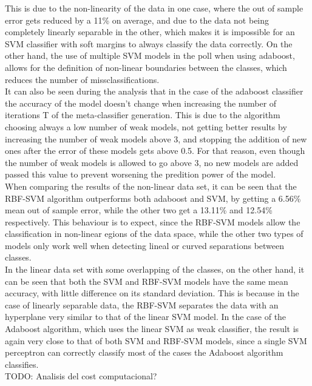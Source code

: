 \documentclass[10pt, journal]{IEEEtran}
\begin{document}
This is due to the non-linearity of the data in one case, where the out of sample error gets reduced by a 11\% on average, and due to the data not being completely linearly separable in the other, which makes it is impossible for an SVM classifier with soft margins to always classify the data correctly. On the other hand, the use of multiple SVM models in the poll when using adaboost, allows for the definition of non-linear boundaries between the classes, which reduces the number of missclassifications.\\

It can also be seen during the analysis that in the case of the adaboost classifier the accuracy of the model doesn't change when increasing the number of iterations T of the meta-classifier generation. This is due to the algorithm choosing always a low number of weak models, not getting better results by increasing the number of weak models above 3, and stopping the addition of new ones after the error of these models gets above 0.5. For that reason, even though the number of weak models is allowed to go above 3, no new models are added passed this value to prevent worsening the predition power of the model.\\

When comparing the results of the non-linear data set, it can be seen that the RBF-SVM algorithm outperforms both adaboost and SVM, by getting a 6.56\% mean out of sample error, while the other two get a 13.11\% and 12.54\% respectively. This behaviour is to expect, since the RBF-SVM models allow the classification in non-linear egions of the data space, while the other two types of models only work well when detecting lineal or curved separations between classes.\\

In the linear data set with some overlapping of the classes, on the other hand, it can be seen that both the SVM and RBF-SVM models have the same mean accuracy, with little difference on its standard deviation. This is because in the case of linearly separable data, the RBF-SVM separates the data with an hyperplane very similar to that of the linear SVM model. In the case of the Adaboost algorithm, which uses the linear SVM as weak classifier, the result is again very close to that of both SVM and RBF-SVM models, since a single SVM perceptron can correctly classify most of the cases the Adaboost algorithm classifies.\\

TODO: Analisis del cost computacional?
\end{document}
